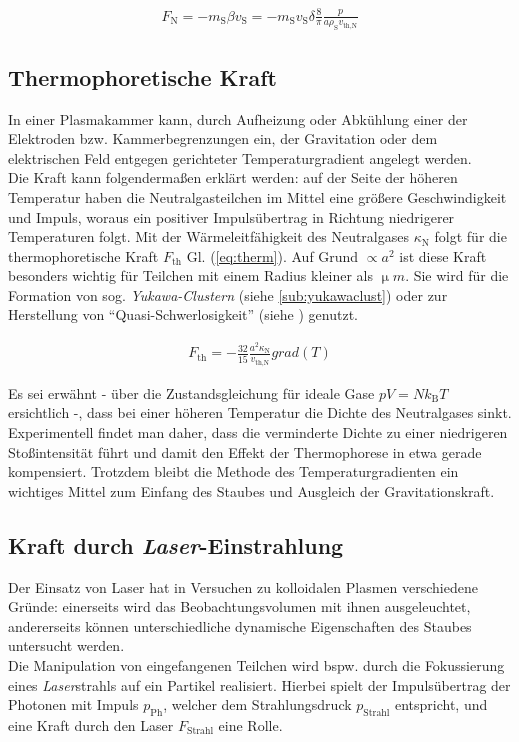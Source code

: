 \documentclass[numbers=noenddot,a4paper,notitlepage,twoside,BCOR15mm]{scrbook}
\newcommand{\ix}[1]{_\text{#1}}
\newcommand{\tilt}[1]{\textit{#1}}
\newcommand{\grad}[1]{\textit{grad}\left(#1\right)}
\begin{document}
				\begin{align}
					F\ix{N}=-m\ix{S}\beta v\ix{S}=-m\ix{S}v\ix{S}\delta\frac{8}{\pi}\frac{p}{a\rho\ix{S}v\ix{th,N}}
				\end{align}

		\subsection{Thermophoretische Kraft}\label{subsub:therm}

			In einer Plasmakammer kann, durch Aufheizung oder Abkühlung einer der Elektroden bzw. Kammerbegrenzungen ein, der Gravitation oder dem elektrischen Feld entgegen gerichteter Temperaturgradient angelegt werden.\\
			Die Kraft kann folgendermaßen erklärt werden: auf der Seite der höheren Temperatur haben die Neutralgasteilchen im Mittel eine größere Geschwindigkeit und Impuls, woraus ein positiver Impulsübertrag in Richtung niedrigerer Temperaturen folgt.	Mit der Wärmeleitfähigkeit des Neutralgases $\kappa\ix{N}$ folgt für die thermophoretische Kraft $F\ix{th}$ Gl. (\ref{eq:therm}). Auf Grund $\propto a^2$ ist diese Kraft besonders wichtig für Teilchen mit einem Radius kleiner als $\unit{\upmu m}$. Sie wird für die Formation von sog. \tilt{Yukawa-Clustern} (siehe \ref{sub:yukawaclust}) oder zur Herstellung von "`Quasi-Schwerlosigkeit"' (siehe \cite{Rothermel02}) genutzt.

				\begin{align}
					F\ix{th}=-\frac{32}{15}\frac{a^2 \kappa\ix{N}}{v\ix{th,N}}\grad{T} \label{eq:therm}
				\end{align}

			Es sei erwähnt -  über die Zustandsgleichung für ideale Gase $pV=Nk\ix{B}T$ ersichtlich -, dass bei einer höheren Temperatur die Dichte des Neutralgases sinkt. Experimentell findet man daher, dass die verminderte Dichte zu einer niedrigeren Stoßintensität führt und damit den Effekt der Thermophorese in etwa gerade kompensiert. Trotzdem bleibt die Methode des Temperaturgradienten ein wichtiges Mittel zum Einfang des Staubes und Ausgleich der Gravitationskraft.

	\newpage

		\subsection{Kraft durch \tilt{Laser}-Einstrahlung}\label{subsub:laser}

			Der Einsatz von Laser hat in Versuchen zu kolloidalen Plasmen verschiedene Gründe: einerseits wird das Beobachtungsvolumen mit ihnen ausgeleuchtet, andererseits können unterschiedliche dynamische Eigenschaften des Staubes untersucht werden.\\
			Die Manipulation von eingefangenen Teilchen wird bspw. durch die Fokussierung eines \tilt{Laser}strahls auf ein Partikel realisiert. Hierbei spielt der Impulsübertrag der Photonen mit Impuls $p\ix{Ph}$, welcher dem Strahlungsdruck $p\ix{Strahl}$ entspricht, und eine Kraft durch den Laser $F\ix{Strahl}$ \cite{Ashkin70} eine Rolle.
\end{document}
